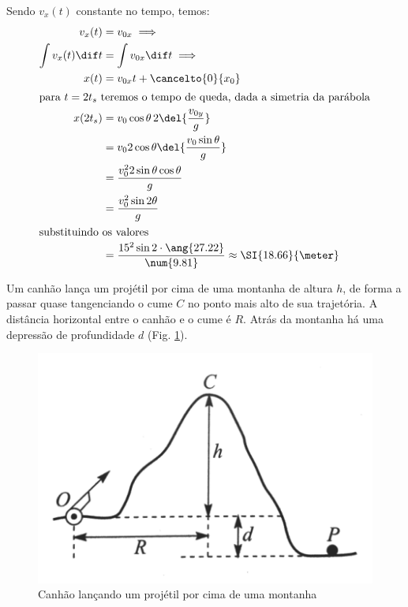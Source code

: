 \documentclass[]{IMTexam}
\begin{document}
\begin{questions}
\begin{parts}
\begin{solution}
\begin{multi}
				Sendo $ v_x(t) $ constante no tempo, temos:
				\begin{align*}
					v_x(t)            & =v_{0x}\implies                                                             \\
					\int v_x(t)\dif t & =\int v_{0x}\dif t\implies                                                  \\
					x(t)              & =v_{0x}t + \cancelto{0}{x_0}                                                \\
					\intertext{para $ t=2t_s $ teremos o tempo de queda, dada a simetria da parábola}
					x(2t_s)           & =v_{0}\cos\theta \,2 \del{\dfrac{v_{0y}}{g}}                                \\
					                  & =v_{0}2\cos\theta \del{\dfrac{v_{0}\sin\theta}{g}}                          \\
					                  & =\dfrac{v_{0}^{2}2\sin\theta\cos\theta}{g}                                  \\
					                  & =\dfrac{v_{0}^{2}\sin{2\theta}}{g}                                          \\
					\intertext{substituindo os valores}
					                  & =\dfrac{15^{2}\sin{2\cdot\ang{27.22}}}{\num{9.81}}\approx\SI{18.66}{\meter}
				\end{align*}
			\end{multi}
		\end{solution}
	\end{parts}

	\question
	Um canhão lança um projétil por cima de uma montanha de altura $ h $, de forma a passar quase tangenciando o cume $ C $ no ponto mais alto de sua trajetória. A distância horizontal entre o canhão e o cume é $ R $. Atrás da montanha há uma depressão de profundidade $ d $ (Fig. \ref{fig:fig1}).

	\begin{figure}[H]
		\centering
		\includegraphics[width=0.7\linewidth]{screenshot001}
		\caption{Canhão lançando um projétil por cima de uma montanha}
		\label{fig:fig1}
	\end{figure}


\end{questions}
\end{document}
